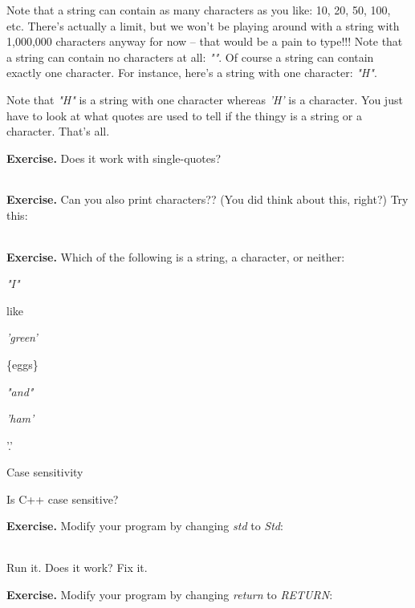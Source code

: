 \documentclass[
]{article}
\begin{document}
Note that a string can contain as many characters as you like: 10, 20,
50, 100, etc. There's actually a limit, but we won't be playing around
with a string with 1,000,000 characters anyway for now -- that would be
a pain to type!!! Note that a string can contain no characters at all:
\emph{""}. Of course a string can contain exactly one character. For
instance, here's a string with one character:\emph{ "H"}.

Note that \emph{"H"} is a string with one character whereas \emph{'H'}
is a character. You just have to look at what quotes are used to tell if
the thingy is a string or a character. That's all.

\textbf{Exercise.} Does it work with single-quotes?

\begin{longtable}[]{@{}@{}}
\toprule
\endhead
\bottomrule
\end{longtable}

\textbf{Exercise.} Can you also print characters?? (You did think about
this, right?) Try this:

\begin{longtable}[]{@{}@{}}
\toprule
\endhead
\bottomrule
\end{longtable}

\textbf{Exercise.} Which of the following is a string, a character, or
neither:

\emph{"I"}

like

\emph{'green'}

\{eggs\}

\emph{"and"}

\emph{'ham'}

'.'

Case sensitivity

Is C++ case sensitive?

\textbf{Exercise.} Modify your program by changing \emph{std} to
\emph{Std}:

\begin{longtable}[]{@{}@{}}
\toprule
\endhead
\bottomrule
\end{longtable}

Run it. Does it work? Fix it.

\textbf{Exercise.} Modify your program by changing \emph{return} to
\emph{RETURN}:

\begin{longtable}[]{@{}@{}}
\toprule
\endhead
\bottomrule
\end{longtable}
\end{document}
